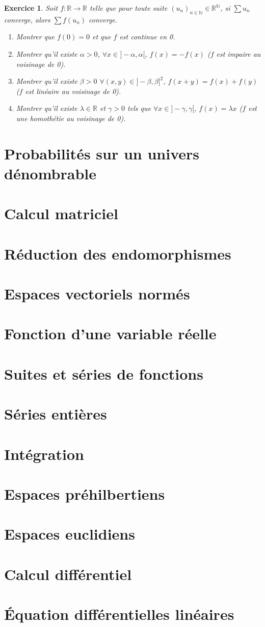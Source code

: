 \documentclass[12pt]{article}
\newtheorem{exercise}{Exercice}[section]
\theoremstyle{remark}
\theoremstyle{remark}
\newcommand{\R}{\mathbb{R}}
\newcommand{\N}{\mathbb{N}}
\begin{document}
\begin{exercise}
	Soit $f:\R\to\R$ telle que pour toute suite $(u_{n})_{n\in\N}\in\R^{\N}$, si
$\sum u_{n}$ converge, alors $\sum f(u_{n})$ converge.
\begin{enumerate}
	\item Montrer que $f(0)=0$ et que $f$ est continue en 0.
	\item Montrer qu'il existe $\alpha>0$, $\forall x\in]-\alpha,\alpha[$,
	$f(x)=-f(x)$ ($f$ est impaire au voisinage de 0).
	\item Montrer qu'il existe $\beta>0$ $\forall(x,y)\in]-\beta,\beta[^{2}$,
	$f(x+y)=f(x)+f(y)$ ($f$ est linéaire au voisinage de 0).
	\item Montrer qu'il existe $\lambda\in\R$ et $\gamma>0$ tels que $\forall
	x\in]-\gamma,\gamma[$, $f(x)=\lambda x$ ($f$ est une homothétie au voisinage
	de 0).
\end{enumerate}
\end{exercise}

\cleardoublepage
\section{Probabilités sur un univers dénombrable}
\cleardoublepage
\section{Calcul matriciel}
\cleardoublepage
\section{Réduction des endomorphismes}
\cleardoublepage
\section{Espaces vectoriels normés}
\cleardoublepage
\section{Fonction d'une variable réelle}
\cleardoublepage
\section{Suites et séries de fonctions}
\cleardoublepage
\section{Séries entières}
\cleardoublepage
\section{Intégration}
\cleardoublepage
\section{Espaces préhilbertiens}
\cleardoublepage
\section{Espaces euclidiens}
\cleardoublepage
\section{Calcul différentiel}
\cleardoublepage
\section{\'Equation différentielles linéaires}
\end{document}
